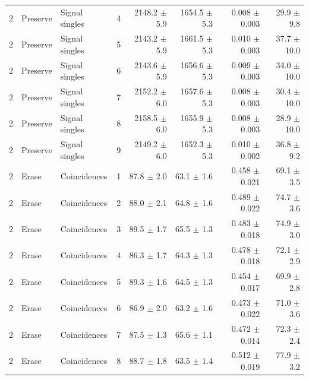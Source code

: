 \begin{tabular}{llllrrrr}
2 & Preserve & Signal singles & 4 & 2148.2 \ensuremath{\pm} 5.9 & 1654.5 \ensuremath{\pm} 5.3 & 0.008 \ensuremath{\pm} 0.003 & 29.9 \ensuremath{\pm} 9.8 \\
2 & Preserve & Signal singles & 5 & 2143.2 \ensuremath{\pm} 5.9 & 1661.5 \ensuremath{\pm} 5.3 & 0.010 \ensuremath{\pm} 0.003 & 37.7 \ensuremath{\pm} 10.0 \\
2 & Preserve & Signal singles & 6 & 2143.6 \ensuremath{\pm} 5.9 & 1656.6 \ensuremath{\pm} 5.3 & 0.009 \ensuremath{\pm} 0.003 & 34.0 \ensuremath{\pm} 10.0 \\
2 & Preserve & Signal singles & 7 & 2152.2 \ensuremath{\pm} 6.0 & 1657.6 \ensuremath{\pm} 5.3 & 0.008 \ensuremath{\pm} 0.003 & 30.4 \ensuremath{\pm} 10.0 \\
2 & Preserve & Signal singles & 8 & 2158.5 \ensuremath{\pm} 6.0 & 1655.9 \ensuremath{\pm} 5.3 & 0.008 \ensuremath{\pm} 0.003 & 28.9 \ensuremath{\pm} 10.0 \\
2 & Preserve & Signal singles & 9 & 2149.2 \ensuremath{\pm} 6.0 & 1652.3 \ensuremath{\pm} 5.3 & 0.010 \ensuremath{\pm} 0.002 & 36.8 \ensuremath{\pm} 9.2 \\
\midrule
2 & Erase & Coincidences & 1 & 87.8 \ensuremath{\pm} 2.0 & 63.1 \ensuremath{\pm} 1.6 & 0.458 \ensuremath{\pm} 0.021 & 69.1 \ensuremath{\pm} 3.5 \\
2 & Erase & Coincidences & 2 & 88.0 \ensuremath{\pm} 2.1 & 64.8 \ensuremath{\pm} 1.6 & 0.489 \ensuremath{\pm} 0.022 & 74.7 \ensuremath{\pm} 3.6 \\
2 & Erase & Coincidences & 3 & 89.5 \ensuremath{\pm} 1.7 & 65.5 \ensuremath{\pm} 1.3 & 0.483 \ensuremath{\pm} 0.018 & 74.9 \ensuremath{\pm} 3.0 \\
2 & Erase & Coincidences & 4 & 86.3 \ensuremath{\pm} 1.7 & 64.3 \ensuremath{\pm} 1.3 & 0.478 \ensuremath{\pm} 0.018 & 72.1 \ensuremath{\pm} 2.9 \\
2 & Erase & Coincidences & 5 & 89.3 \ensuremath{\pm} 1.6 & 64.5 \ensuremath{\pm} 1.3 & 0.454 \ensuremath{\pm} 0.017 & 69.9 \ensuremath{\pm} 2.8 \\
2 & Erase & Coincidences & 6 & 86.9 \ensuremath{\pm} 2.0 & 63.2 \ensuremath{\pm} 1.6 & 0.473 \ensuremath{\pm} 0.022 & 71.0 \ensuremath{\pm} 3.6 \\
2 & Erase & Coincidences & 7 & 87.5 \ensuremath{\pm} 1.3 & 65.6 \ensuremath{\pm} 1.1 & 0.472 \ensuremath{\pm} 0.014 & 72.3 \ensuremath{\pm} 2.4 \\
2 & Erase & Coincidences & 8 & 88.7 \ensuremath{\pm} 1.8 & 63.5 \ensuremath{\pm} 1.4 & 0.512 \ensuremath{\pm} 0.019 & 77.9 \ensuremath{\pm} 3.2 \\

\end{tabular}
